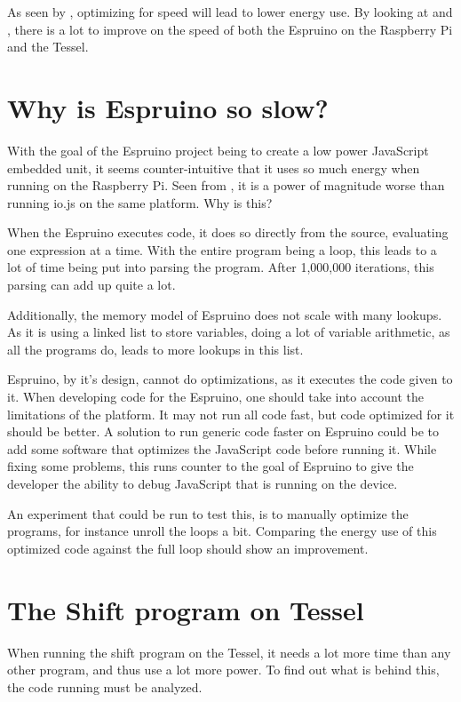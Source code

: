 As seen by \citet{valluri01}, optimizing for speed will lead to lower energy use.
By looking at  and , there is a lot to improve on the speed of both the Espruino on the Raspberry Pi and the Tessel.

\section{Why is Espruino so slow?}
With the goal of the Espruino project being to create a low power JavaScript embedded unit, it seems counter-intuitive that it uses so much energy when running on the Raspberry Pi.
Seen from , it is a power of magnitude worse than running io.js on the same platform.
Why is this?

When the Espruino executes code, it does so directly from the source, evaluating one expression at a time.
With the entire program being a loop, this leads to a lot of time being put into parsing the program.
After 1,000,000 iterations, this parsing can add up quite a lot.

Additionally, the memory model of Espruino does not scale with many lookups.
As it is using a linked list to store variables, doing a lot of variable arithmetic, as all the programs do, leads to more lookups in this list.

Espruino, by it's design, cannot do optimizations, as it executes the code given to it.
When developing code for the Espruino, one should take into account the limitations of the platform.
It may not run all code fast, but code optimized for it should be better.
A solution to run generic code faster on Espruino could be to add some software that optimizes the JavaScript code before running it.
While fixing some problems, this runs counter to the goal of Espruino to give the developer the ability to debug JavaScript that is running on the device.

An experiment that could be run to test this, is to manually optimize the programs, for instance unroll the loops a bit.
Comparing the energy use of this optimized code against the full loop should show an improvement.

\section{The Shift program on Tessel}
\label{sec:shifttessel}
When running the shift program on the Tessel, it needs a lot more time than any other program, and thus use a lot more power.
To find out what is behind this, the code running must be analyzed.


